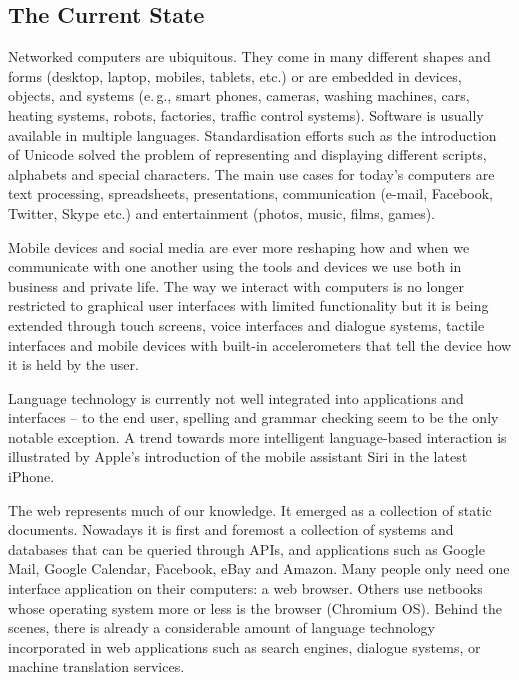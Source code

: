 \documentclass[10pt, plain]{../../metanetpaper}
\begin{document}
\begin{multicols}{2}

\subsection{The Current State}
\label{sec:ict-trends}

Networked computers are ubiquitous. They come in many different shapes and forms (desktop, laptop, mobiles, tablets, etc.) or are embedded in devices, objects, and systems (e.\,g., smart phones, cameras, washing machines, cars, heating systems, robots, factories, traffic control systems). Software is usually available in multiple languages. Standardisation efforts such as the introduction of Unicode solved the problem of representing and displaying different scripts, alphabets and special characters. The main use cases for today's computers are text processing, spreadsheets, presentations, communication (e-mail, Facebook, Twitter, Skype etc.) and entertainment (photos, music, films, games).

Mobile devices and social media are ever more reshaping how and when we communicate with one another using the tools and devices we use both in business and private life. The way we interact with computers is no longer restricted to graphical user interfaces with limited functionality but it is being extended through touch screens, voice interfaces and dialogue systems, tactile interfaces and mobile devices with built-in accelerometers that tell the device how it is held by the user.

Language technology is currently not well integrated into applications and interfaces -- to the end user, spelling and grammar checking seem to be the only notable exception. A trend towards more intelligent language-based interaction is illustrated by Apple’s introduction of the mobile assistant Siri in the latest iPhone.

The web represents much of our knowledge. It emerged as a collection of static documents. Nowadays it is first and foremost a collection of systems and databases that can be queried through APIs, and applications such as Google Mail, Google Calendar, Facebook, eBay and Amazon. Many people only need one interface application on their computers: a web browser. Others use netbooks whose operating system more or less is the browser (Chromium OS). Behind the scenes, there is already a considerable amount of language technology incorporated in web applications such as search engines, dialogue systems, or machine translation services.


\end{multicols}
\end{document}
